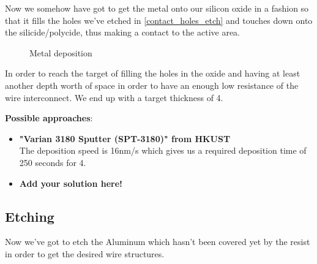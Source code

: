 Now we somehow have got to get the metal onto our silicon oxide in a fashion so that it fills the holes we've etched in \autoref{contact_holes_etch} and touches down onto the silicide/polycide, thus making a contact to the active area.

\begin{figure}[H]
	\centering
	\begin{tikzpicture}[node distance = 3cm, auto, thick,scale=\CrossSectionOnly, every node/.style={transform shape}]
		
	\end{tikzpicture}
	\drawStepArrow{}
	\begin{tikzpicture}[node distance = 3cm, auto, thick,scale=\CrossSectionOnly, every node/.style={transform shape}]
		
	\end{tikzpicture}
	\caption{Metal deposition}
\end{figure}

In order to reach the target of filling the holes in the oxide and having at least another depth worth of space in order to have an enough low resistance of the wire interconnect.
We end up with a target thickness of 4\um.

\textbf{Possible approaches}:
\begin{itemize}
	\item \textbf{"Varian 3180 Sputter (SPT-3180)" from HKUST} \\
	The deposition speed is 16nm/s which gives us a required deposition time of 250 seconds for 4\um.
	\item \textbf{Add your solution here!}
\end{itemize}

\newpage

\subsection{Etching}\label{metal_wire_etch}

Now we've got to etch the Aluminum which hasn't been covered yet by the resist in order to get the desired wire structures.

